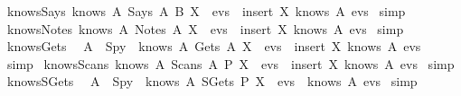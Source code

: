 \begin{isabellebody}
  \ knows{\isacharunderscore}Says{\isacharcolon}\ {\isachardoublequoteopen}knows\ A\ {\isacharparenleft}Says\ A\ B\ X\ {\isacharhash}\ evs{\isacharparenright}\ {\isacharequal}\ insert\ X\ {\isacharparenleft}knows\ A\ evs{\isacharparenright}{\isachardoublequoteclose}\isanewline
  \isadelimproof
  \endisadelimproof
  \isatagproof
  \isamarkupfalse%
  \ simp%
  \endisatagproof
  {\isafoldproof}%
  \isadelimproof
  \isanewline
  \endisadelimproof
  \isanewline
  \isamarkupfalse%
  \ knows{\isacharunderscore}Notes{\isacharcolon}\ {\isachardoublequoteopen}knows\ A\ {\isacharparenleft}Notes\ A\ X\ {\isacharhash}\ evs{\isacharparenright}\ {\isacharequal}\ insert\ X\ {\isacharparenleft}knows\ A\ evs{\isacharparenright}{\isachardoublequoteclose}\isanewline
  \isadelimproof
  \endisadelimproof
  \isatagproof
  \isamarkupfalse%
  \ simp%
  \endisatagproof
  {\isafoldproof}%
  \isadelimproof
  \isanewline
  \endisadelimproof
  \isanewline
  \isamarkupfalse%
  \ knows{\isacharunderscore}Gets{\isacharcolon}\isanewline
  \ \ {\isachardoublequoteopen}A\ {\isasymnoteq}\ Spy\ {\isasymlongrightarrow}\ knows\ A\ {\isacharparenleft}Gets\ A\ X\ {\isacharhash}\ evs{\isacharparenright}\ {\isacharequal}\ insert\ X\ {\isacharparenleft}knows\ A\ evs{\isacharparenright}{\isachardoublequoteclose}\isanewline
  \isadelimproof
  \endisadelimproof
  \isatagproof
  \isamarkupfalse%
  \ simp%
  \endisatagproof
  {\isafoldproof}%
  \isadelimproof
  \isanewline
  \endisadelimproof
  \isanewline
  \isamarkupfalse%
  \ knows{\isacharunderscore}Scans{\isacharcolon}\ {\isachardoublequoteopen}knows\ A\ {\isacharparenleft}Scans\ A\ P\ X\ {\isacharhash}\ evs{\isacharparenright}\ {\isacharequal}\ insert\ X\ {\isacharparenleft}knows\ A\ evs{\isacharparenright}{\isachardoublequoteclose}\isanewline
  \isadelimproof
  \endisadelimproof
  \isatagproof
  \isamarkupfalse%
  \ simp%
  \endisatagproof
  {\isafoldproof}%
  \isadelimproof
  \isanewline
  \endisadelimproof
  \isanewline
  \isamarkupfalse%
  \ knows{\isacharunderscore}SGets{\isacharcolon}\isanewline
  \ \ {\isachardoublequoteopen}A\ {\isasymnoteq}\ Spy\ {\isasymlongrightarrow}\ knows\ A\ {\isacharparenleft}SGets\ P\ X\ {\isacharhash}\ evs{\isacharparenright}\ {\isacharequal}\ knows\ A\ evs{\isachardoublequoteclose}\isanewline
  \isadelimproof
  \endisadelimproof
  \isatagproof
  \isamarkupfalse%
  \ simp%
  \endisatagproof

\end{isabellebody}
